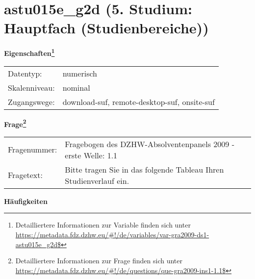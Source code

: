 
    \setcounter{footnote}{0}

    \vspace*{-1.8cm}
	\section{astu015e\_g2d (5. Studium: Hauptfach (Studienbereiche))}
	\label{section:astu015e_g2d}



    \vspace*{0.5cm}
    \noindent\textbf{Eigenschaften\footnote{Detailliertere Informationen zur Variable finden sich unter
		\url{https://metadata.fdz.dzhw.eu/\#!/de/variables/var-gra2009-ds1-astu015e_g2d$}}}\\
	\begin{tabularx}{\hsize}{@{}lX}
	Datentyp: & numerisch \\
	Skalenniveau: & nominal \\
	Zugangswege: &
	  download-suf, 
	  remote-desktop-suf, 
	  onsite-suf
 \\
    \end{tabularx}



				\vspace*{0.5cm}
                \noindent\textbf{Frage\footnote{Detailliertere Informationen zur Frage finden sich unter
		              \url{https://metadata.fdz.dzhw.eu/\#!/de/questions/que-gra2009-ins1-1.1$}}}\\
				\begin{tabularx}{\hsize}{@{}lX}
					Fragenummer: &
					  Fragebogen des DZHW-Absolventenpanels 2009 - erste Welle:
					  1.1
 \\
					Fragetext: & Bitte tragen Sie in das folgende Tableau Ihren Studienverlauf ein. \\
				\end{tabularx}





        		\vspace*{0.5cm}
                \noindent\textbf{Häufigkeiten}

